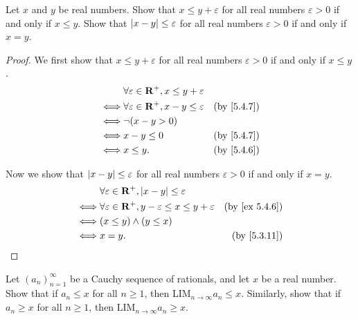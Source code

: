 \begin{exercise}\label{ex 5.4.7}
  Let \(x\) and \(y\) be real numbers.
  Show that \(x \leq y + \varepsilon\) for all real numbers \(\varepsilon > 0\) if and only if \(x \leq y\).
  Show that \(\left\lvert x - y\right\rvert \leq \varepsilon\) for all real numbers \(\varepsilon > 0\) if and only if \(x = y\).
\end{exercise}

\begin{proof}
  We first show that \(x \leq y + \varepsilon\) for all real numbers \(\varepsilon > 0\) if and only if \(x \leq y\).
  \begin{align*}
         & \forall \varepsilon \in \R^+, x \leq y + \varepsilon                            \\
    \iff & \forall \varepsilon \in \R^+, x - y \leq \varepsilon & \text{(by \cref{5.4.7})} \\
    \iff & \lnot (x - y > 0)                                                               \\
    \iff & x - y \leq 0                                         & \text{(by \cref{5.4.7})} \\
    \iff & x \leq y.                                            & \text{(by \cref{5.4.6})}
  \end{align*}

  Now we show that \(\left\lvert x - y\right\rvert \leq \varepsilon\) for all real numbers \(\varepsilon > 0\) if and only if \(x = y\).
  \begin{align*}
         & \forall \varepsilon \in \R^+, \abs{x - y} \leq \varepsilon                                              \\
    \iff & \forall \varepsilon \in \R^+, y - \varepsilon \leq x \leq y + \varepsilon & \text{(by \cref{ex 5.4.6})} \\
    \iff & (x \leq y) \land (y \leq x)                                                                             \\
    \iff & x = y.                                                                    & \text{(by \cref{5.3.11})}
  \end{align*}
\end{proof}

\begin{exercise}\label{ex 5.4.8}
  Let \((a_n)_{n = 1}^{\infty}\) be a Cauchy sequence of rationals, and let \(x\) be a real number.
  Show that if \(a_n \leq x\) for all \(n \geq 1\), then \(\text{LIM}_{n \to \infty} a_n \leq x\).
  Similarly, show that if \(a_n \geq x\) for all \(n \geq 1\), then \(\text{LIM}_{n \to \infty} a_n \geq x\).
\end{exercise}

